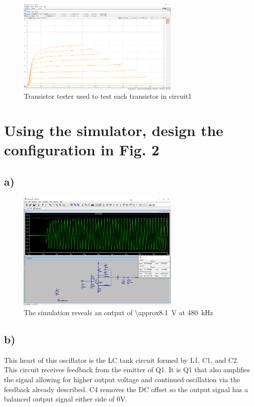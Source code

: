 \documentclass{article}
\begin{document}
	\begin{figure}[H]
	    \centering
	    \includegraphics[width=0.7\textwidth]{transistor-tester}
	    \caption{Transistor tester used to test each transistor in circuit1}
	\end{figure}	
	
	\section{Using the simulator, design the configuration in Fig. 2}
	
	\subsection*{a)}
	
	\begin{figure}[H]
	    \centering
	    \includegraphics[width=0.7\textwidth]{sim2-a}
	    \caption{The simulation reveals an output of \SI{\approx8.1}{\volt} at \SI{480}{\kilo\hertz}}
	\end{figure}

	\subsection*{b)}
	
	This heart of this oscillator is the LC tank circuit formed by L1, C1, and C2. This circuit receives feedback from the emitter of Q1. It is Q1 that also amplifies the signal allowing for higher output voltage and continued oscillation via the feedback already described. C4 removes the DC offset so the output signal has a balanced output signal either side of 0V.
	
\end{document}
